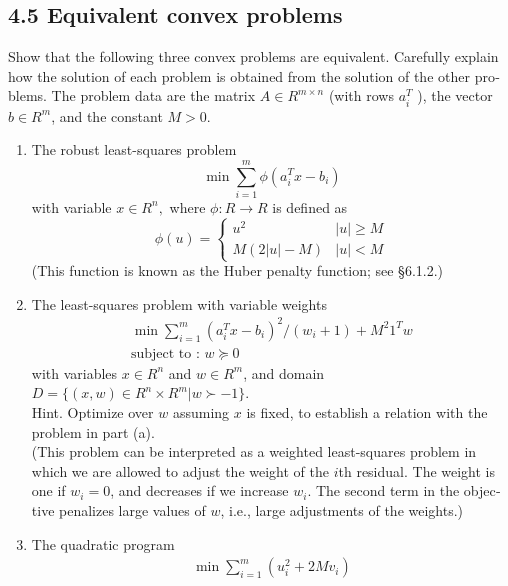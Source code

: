\begin{latin}

\section{4.5 Equivalent convex problems}
Show that the following three convex problems are equivalent. Carefully explain how the solution of each problem is obtained from the solution of the other problems. The problem data are the matrix $ A \in R^{m \times n} $ (with rows $ a^{T}_{i} $ ), the vector $ b \in R^{m} $, and the constant $ M > 0 $.

\begin{enumerate}
	\item The robust least-squares problem
	\begin{equation*}
		\min \sum_{i=1}^{m}  \phi(a^{T}_{i} x - b_{i})
	\end{equation*}
	with variable $ x \in R^{n}, $ where $ \phi : R \to R $ is defined as
	\begin{equation*}
		\phi(u) = \begin{cases}
			u^{2}  & |u| \geq M \\
			M(2|u|-M) & |u|<M
		\end{cases}
	\end{equation*}
	(This function is known as the Huber penalty function; see §6.1.2.)
	\item
	The least-squares problem with variable weights
	\begin{gather*}
		\min \sum_{i=1}^{m} (a_{i}^{T}x - b_{i})^{2}/(w_{i}+1) + M^{2} 1^{T} w
		\\
		\text{subject to : } w \succeq 0
	\end{gather*}
	with variables $ x \in R^{n} $ and $ w \in R^{m}$, and domain $ D = \{(x, w) \in R^{n} \times R^{m} | w \succ -1\}. $
	\\
	Hint. Optimize over $ w $ assuming $ x $ is fixed, to establish a relation with the problem in part (a).
	\\
	(This problem can be interpreted as a weighted least-squares problem in which we are allowed to adjust the weight of the $ i $th residual. The weight is one if $ w_{i} = 0 $, and
	decreases if we increase $ w_{i} $. The second term in the objective penalizes large values of $ w $, i.e., large adjustments of the weights.)
	\item The quadratic program
	\begin{gather*}
		\min \sum_{i=1}^{m} (u^{2}_{i} + 2Mv_{i})
		\\

\end{gather*}
\end{enumerate}
\end{latin}

